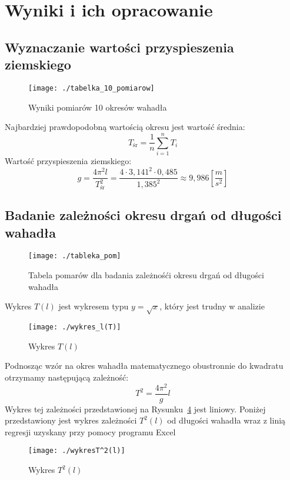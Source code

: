 \documentclass [a4paper,11pt]{article}
\begin{document}
\section{Wyniki i ich opracowanie}
\subsection{Wyznaczanie wartości przyspieszenia ziemskiego}


\begin{figure}[h!]
\centering
\texttt{[image: ./tabelka\_10\_pomiarow]}
\caption{Wyniki pomiarów 10 okresów wahadła}
\label{fig:tabelka_10_pomiarow}

\end{figure}


 Najbardziej prawdopodobną wartością okresu jest
wartość średnia: 
$$ T_{\text{śr}}  = \frac{1}{n} \sum_{i=1}^{n} T_i $$
Wartość przyspieszenia ziemskiego:
$$g= \frac{4 \pi ^2 l}{ T_{\text{śr}}^2} = \frac{4 \cdot 3,141^2 \cdot 0,485} {1,385^2} \approx 9,986 \left[ \frac{m}{s^2} \right] $$


\newpage


\subsection{Badanie zależności okresu drgań od długości wahadła}
\begin{figure}[h!]
\centering
\texttt{[image: ./tableka\_pom]}
\caption{Tabela pomarów dla badania zależnośći okresu drgań od długości wahadła}
\label{fig:tableka_pom}
\end{figure}

 Wykres $T(l)$ jest wykresem typu $y= \sqrt{x}$, który jest trudny w analizie

\begin{figure}[h!]
\centering
\texttt{[image: ./wykres\_l(T)]}
\caption{Wykres $T(l)$}
\label{fig:wykresl(T)}
\end{figure}

Podnosząc wzór na okres wahadła matematycznego obustronnie do kwadratu otrzymamy następującą zależność:
$$ T^2 = \frac{4 \pi^2}{g} l $$ 
Wykres tej zależności przedstawionej na Rysunku~\ref{fig:wykresT^2(l)}  jest liniowy.
Poniżej przedstawiony jest wykres zależności $T^2(l)$ od długości wahadła wraz z linią regresji uzyskany przy pomocy programu Excel
  
\begin{figure}[h!]
\centering
\texttt{[image: ./wykresT^2(l)]}
\caption{Wykres $T^2(l)$}
\label{fig:wykresT^2(l)}
\end{figure}
\end{document}
